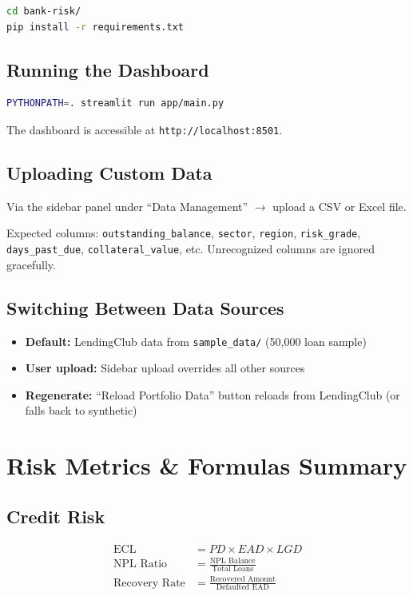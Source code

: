 \documentclass[12pt,a4paper]{article}
\begin{document}
\begin{lstlisting}[language=bash]
cd bank-risk/
pip install -r requirements.txt
\end{lstlisting}

\subsection{Running the Dashboard}

\begin{lstlisting}[language=bash]
PYTHONPATH=. streamlit run app/main.py
\end{lstlisting}

The dashboard is accessible at \texttt{http://localhost:8501}.

\subsection{Uploading Custom Data}

Via the sidebar panel under ``Data Management'' $\rightarrow$ upload a CSV or Excel file.

Expected columns: \texttt{outstanding\_balance}, \texttt{sector}, \texttt{region}, \texttt{risk\_grade}, \texttt{days\_past\_due}, \texttt{collateral\_value}, etc. Unrecognized columns are ignored gracefully.

\subsection{Switching Between Data Sources}

\begin{itemize}
    \item \textbf{Default:} LendingClub data from \texttt{sample\_data/} (50,000 loan sample)
    \item \textbf{User upload:} Sidebar upload overrides all other sources
    \item \textbf{Regenerate:} ``Reload Portfolio Data'' button reloads from LendingClub (or falls back to synthetic)
\end{itemize}

\section{Risk Metrics \& Formulas Summary}

\subsection{Credit Risk}
\begin{align*}
\text{ECL} &= PD \times EAD \times LGD \\
\text{NPL Ratio} &= \frac{\text{NPL Balance}}{\text{Total Loans}} \\
\text{Recovery Rate} &= \frac{\text{Recovered Amount}}{\text{Defaulted EAD}}
\end{align*}
\end{document}
